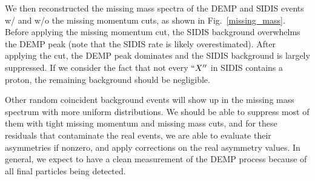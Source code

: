 We then reconstructed the missing mass spectra of the DEMP and SIDIS events w/
and w/o the missing momentum cuts, as shown in Fig.~\ref{missing_mass}. Before
applying the missing momentum cut, the SIDIS background overwhelms the DEMP
peak (note that the SIDIS rate is likely overestimated). After applying the
cut, the DEMP peak dominates and the SIDIS background is largely suppressed. If
we consider the fact that not every $``X''$ in SIDIS contains a proton, the
remaining background should be negligible.

Other random coincident background events will show up in the missing mass spectrum with more uniform distributions. We should be able to suppress most of them with tight missing momentum and missing mass cuts, and for these residuals that contaminate the real events, we are able to evaluate their asymmetries if nonzero, and apply corrections on the real asymmetry values. In general, we expect to have a clean measurement of the DEMP process because of all final particles being detected.